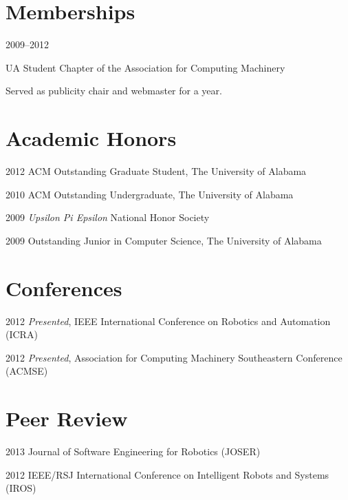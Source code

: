 \documentclass[11pt]{simplecv}
\begin{document}
\section{Memberships} 

\begin{topic}

\item[2009--2012] {
  UA Student Chapter of the Association for Computing Machinery
  
  Served as publicity chair and webmaster for a year.
}

\end{topic}

\section{Academic Honors} 
\begin{topic}
  \item [2012] { ACM Outstanding Graduate Student, The University of Alabama }
  \item [2010] { ACM Outstanding Undergraduate, The University of Alabama }
  \item [2009] { \textit{Upsilon Pi Epsilon} National Honor Society }
  \item [2009] { Outstanding Junior in Computer Science, The University of Alabama }
\end{topic}

\section{Conferences}
\begin{topic}
  \item [2012] { 
    \textit{Presented},
    IEEE International Conference on Robotics and Automation (ICRA)
  }
  \item [2012] { 
    \textit{Presented},
    Association for Computing Machinery Southeastern Conference (ACMSE)
  }
\end{topic}

\section{Peer Review}
\begin{topic}
  \item [2013] { 
    Journal of Software Engineering for Robotics (JOSER)
  }
  \item [2012] { 
    IEEE/RSJ International Conference on Intelligent Robots and Systems (IROS)
  }
\end{topic}

\nocite{*}


\end{document}
